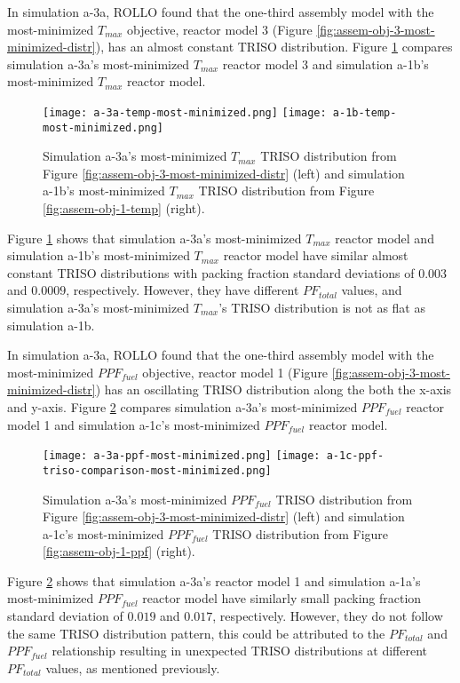 In simulation a-3a, \gls{ROLLO} found that the one-third assembly model with the 
most-minimized $T_{max}$ objective, reactor model 3 (Figure 
\ref{fig:assem-obj-3-most-minimized-distr}), has an almost constant TRISO distribution.
Figure \ref{fig:a-3a-temp-triso-comparison} compares simulation a-3a's most-minimized 
$T_{max}$ reactor model 3 and simulation a-1b's most-minimized $T_{max}$ reactor model. 
\begin{figure}[htbp!]
    \centering
    \texttt{[image: a-3a-temp-most-minimized.png]} 
    \texttt{[image: a-1b-temp-most-minimized.png]} 
    \caption{Simulation a-3a's most-minimized $T_{max}$ TRISO distribution 
    from Figure \ref{fig:assem-obj-3-most-minimized-distr} (left) and simulation a-1b's 
    most-minimized $T_{max}$ TRISO distribution from Figure 
    \ref{fig:assem-obj-1-temp} (right).}
    \label{fig:a-3a-temp-triso-comparison}
\end{figure}
Figure \ref{fig:a-3a-temp-triso-comparison} shows that simulation a-3a's most-minimized 
$T_{max}$ reactor model and simulation a-1b's most-minimized $T_{max}$ reactor model 
have similar almost constant TRISO distributions with packing fraction standard 
deviations of $0.003$ and $0.0009$, respectively.
However, they have different $PF_{total}$ values, and simulation a-3a's most-minimized 
$T_{max}$'s TRISO distribution is not as flat as simulation a-1b. 

In simulation a-3a, \gls{ROLLO} found that the one-third assembly model with the 
most-minimized $PPF_{fuel}$ objective, reactor model 1 (Figure 
\ref{fig:assem-obj-3-most-minimized-distr}) has an oscillating TRISO distribution 
along the both the x-axis and y-axis.
Figure \ref{fig:a-3a-ppf-triso-comparison} compares simulation a-3a's most-minimized 
$PPF_{fuel}$ reactor model 1 and simulation a-1c's most-minimized $PPF_{fuel}$ reactor 
model. 
\begin{figure}[htbp!]
    \centering
    \texttt{[image: a-3a-ppf-most-minimized.png]} 
    \texttt{[image: a-1c-ppf-triso-comparison-most-minimized.png]} 
    \caption{Simulation a-3a's most-minimized $PPF_{fuel}$ TRISO distribution 
    from Figure \ref{fig:assem-obj-3-most-minimized-distr} (left) and simulation a-1c's 
    most-minimized $PPF_{fuel}$ TRISO distribution from Figure 
    \ref{fig:assem-obj-1-ppf} (right).}
    \label{fig:a-3a-ppf-triso-comparison}
\end{figure}
Figure \ref{fig:a-3a-ppf-triso-comparison} shows that simulation a-3a's reactor model 1 
and simulation a-1a's most-minimized $PPF_{fuel}$ reactor model have similarly small 
packing fraction standard deviation of  $0.019$ and $0.017$, respectively. 
However, they do not follow the same TRISO distribution pattern, this could be 
attributed to the $PF_{total}$ and $PPF_{fuel}$ relationship resulting in unexpected 
TRISO distributions at different $PF_{total}$ values, as mentioned previously. 

